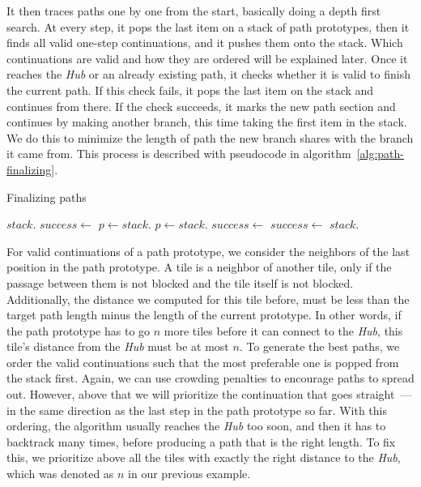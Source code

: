 It then traces paths one by one from the start, basically doing a depth first search.
At every step, it pops the last item on a stack of path prototypes, then it finds all valid one-step continuations, and it pushes them onto the stack.
Which continuations are valid and how they are ordered will be explained later.
Once it reaches the \emph{Hub} or an already existing path, it checks whether it is valid to finish the current path.
If this check fails, it pops the last item on the stack and continues from there.
If the check succeeds, it marks the new path section and continues by making another branch, this time taking the first item in the stack.
We do this to minimize the length of path the new branch shares with the branch it came from.
This process is described with pseudocode in algorithm~\ref{alg:path-finalizing}.

\begin{algorithm}[H]
    \caption{Finalizing paths}
    \label{alg:path-finalizing}
    \begin{algorithmic}[1]
        \State $stack$.
        \State $success \gets$ 
        \Statex
        \State $p \gets stack$.
        \Else
        \State $p \gets stack$.
        \EndIf
        \Statex
        \State $success \gets$ 
        \Else
        \State $success \gets$ 
        \State $stack$.
        \EndFor
        \EndIf
        \EndWhile
        \EndFor
        \Statex
    \end{algorithmic}
\end{algorithm}

For valid continuations of a path prototype, we consider the neighbors of the last position in the path prototype.
A tile is a neighbor of another tile, only if the passage between them is not blocked and the tile itself is not blocked.
Additionally, the distance we computed for this tile before, must be less than the target path length minus the length of the current prototype.
In other words, if the path prototype has to go $n$ more tiles before it can connect to the \emph{Hub}, this tile's distance from the \emph{Hub} must be at most $n$.
To generate the best paths, we order the valid continuations such that the most preferable one is popped from the stack first.
Again, we can use crowding penalties to encourage paths to spread out.
However, above that we will prioritize the continuation that goes straight~--- in the same direction as the last step in the path prototype so far.
With this ordering, the algorithm usually reaches the \emph{Hub} too soon, and then it has to backtrack many times, before producing a path that is the right length.
To fix this, we prioritize above all the tiles with exactly the right distance to the \emph{Hub}, which was denoted as $n$ in our previous example.

